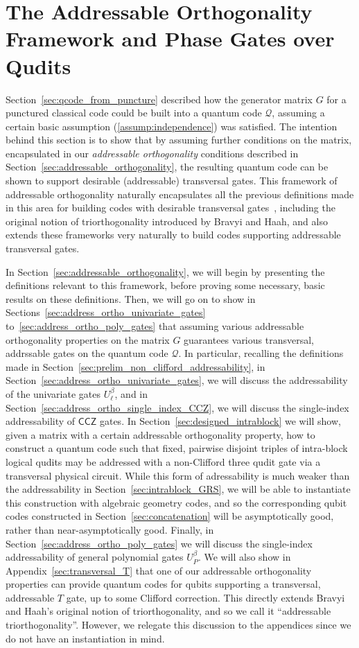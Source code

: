 \documentclass[11pt]{article}
\theoremstyle{definition}
\newcommand{\CCZ}{\mathsf{CCZ}}
\newcommand{\qcode}{\mathcal{Q}}
\begin{document}
\section{The Addressable Orthogonality Framework and Phase Gates over Qudits}\label{sec:addressable_orthogonality_big_section}
Section~\ref{sec:qcode_from_puncture} described how the generator matrix $G$ for a punctured classical code could be built into a quantum code $\qcode$, assuming a certain basic assumption (\ref{assump:independence}) was satisfied. The intention behind this section is to show that by assuming further conditions on the matrix, encapsulated in our \textit{addressable orthogonality} conditions described in Section~\ref{sec:addressable_orthogonality}, the resulting quantum code can be shown to support desirable (addressable) transversal gates. This framework of addressable orthogonality naturally encapsulates all the previous definitions made in this area for building codes with desirable transversal gates~\cite{bravyi2012magic,krishna2019towards,wills2024constant}, including the original notion of triorthogonality introduced by Bravyi and Haah, and also extends these frameworks very naturally to build codes supporting addressable transversal gates.

In Section~\ref{sec:addressable_orthogonality}, we will begin by presenting the definitions relevant to this framework, before proving some necessary, basic results on these definitions. Then, we will go on to show in Sections~\ref{sec:address_ortho_univariate_gates} to~\ref{sec:address_ortho_poly_gates} that assuming various addressable orthogonality properties on the matrix $G$ guarantees various transversal, addrssable gates on the quantum code $\qcode$. In particular, recalling the definitions made in Section~\ref{sec:prelim_non_clifford_addressability}, in Section~\ref{sec:address_ortho_univariate_gates}, we will discuss the addressability of the univariate gates $U_\ell^\beta$, and in Section~\ref{sec:address_ortho_single_index_CCZ}, we will discuss the single-index addressability of $\CCZ$ gates. In Section~\ref{sec:designed_intrablock} we will show, given a matrix with a certain addressable orthogonality property, how to construct a quantum code such that fixed, pairwise disjoint triples of intra-block logical qudits may be addressed with a non-Clifford three qudit gate via a transversal physical circuit. While this form of adressability is much weaker than the addressability in Section~\ref{sec:intrablock_GRS}, we will be able to instantiate this construction with algebraic geometry codes, and so the corresponding qubit codes constructed in Section~\ref{sec:concatenation} will be asymptotically good, rather than near-asymptotically good. Finally, in Section~\ref{sec:address_ortho_poly_gates} we will discuss the single-index addressability of general polynomial gates $U_P^\beta$. We will also show in Appendix~\ref{sec:transversal_T} that one of our addressable orthogonality properties can provide quantum codes for qubits supporting a transversal, addressable $T$ gate, up to some Clifford correction. This directly extends Bravyi and Haah's original notion of triorthogonality, and so we call it ``addressable triorthogonality''. However, we relegate this discussion to the appendices since we do not have an instantiation in mind.
 
\end{document}
